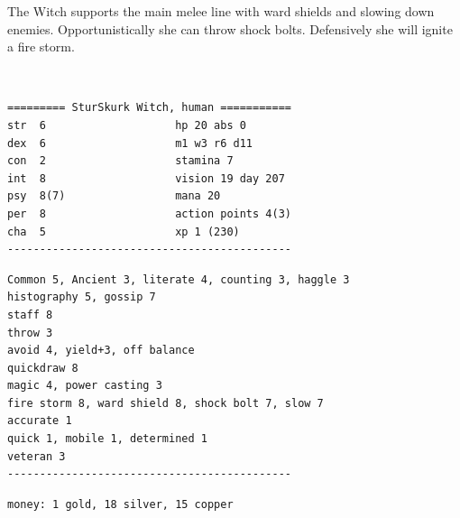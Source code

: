 The Witch supports the main melee line with ward shields and slowing down enemies. Opportunistically she can throw shock bolts. Defensively she will ignite a fire storm.

\

\goodbreak \small \begin{samepage} \begin{verbatim}
========= SturSkurk Witch, human ===========
str  6                    hp 20 abs 0
dex  6                    m1 w3 r6 d11
con  2                    stamina 7
int  8                    vision 19 day 207
psy  8(7)                 mana 20
per  8                    action points 4(3)
cha  5                    xp 1 (230)
--------------------------------------------
\end{verbatim} \goodbreak \begin{verbatim}
Common 5, Ancient 3, literate 4, counting 3, haggle 3
histography 5, gossip 7
staff 8
throw 3
avoid 4, yield+3, off balance
quickdraw 8
magic 4, power casting 3
fire storm 8, ward shield 8, shock bolt 7, slow 7
accurate 1
quick 1, mobile 1, determined 1
veteran 3
--------------------------------------------
\end{verbatim} \goodbreak \begin{verbatim}
money: 1 gold, 18 silver, 15 copper


\end{verbatim}
\end{samepage}
